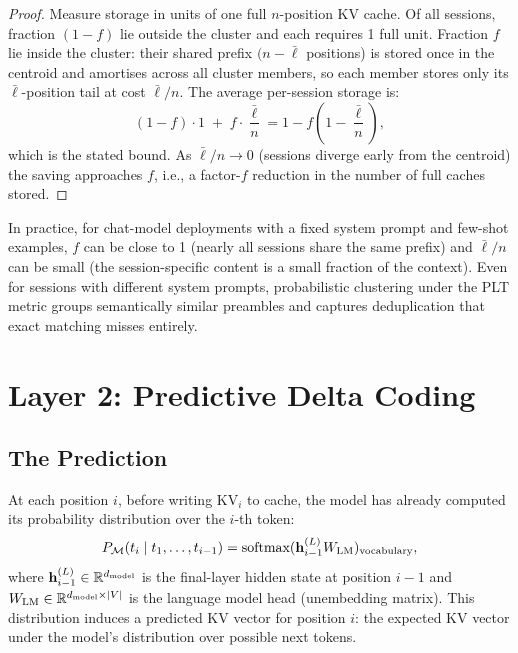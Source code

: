\documentclass[11pt]{article}
\begin{document}
\begin{proof}
Measure storage in units of one full $n$-position KV cache.
Of all sessions, fraction $(1-f)$ lie outside the cluster and each requires
1 full unit.  Fraction $f$ lie inside the cluster: their shared prefix
$(n - \bar{\ell}$ positions) is stored once in the centroid and amortises
across all cluster members, so each member stores only its $\bar{\ell}$-position
tail at cost $\bar{\ell}/n$.  The average per-session storage is:
\[
  (1-f) \cdot 1 \;+\; f \cdot \frac{\bar{\ell}}{n}
  = 1 - f\!\left(1 - \frac{\bar{\ell}}{n}\right),
\]
which is the stated bound.  As $\bar{\ell}/n \to 0$ (sessions diverge early
from the centroid) the saving approaches $f$, i.e., a factor-$f$ reduction
in the number of full caches stored.
\end{proof}

In practice, for chat-model deployments with a fixed system prompt and few-shot
examples, $f$ can be close to 1 (nearly all sessions share the same prefix)
and $\bar{\ell}/n$ can be small (the session-specific content is a small fraction
of the context).  Even for sessions with different system prompts, probabilistic
clustering under the PLT metric groups semantically similar preambles and captures
deduplication that exact matching misses entirely.

\section{Layer 2: Predictive Delta Coding}
\label{sec:delta_coding}

\subsection{The Prediction}

At each position $i$, before writing $\mathrm{KV}_i$ to cache, the model has
already computed its probability distribution over the $i$-th token:
\[
  P_{\mathcal{M}}(t_i \mid t_1, \ldots, t_{i-1}) = \text{softmax}(\mathbf{h}^{(L)}_{i-1} W_{\rm LM})_{\text{vocabulary}},
\]
where $\mathbf{h}^{(L)}_{i-1} \in \mathbb{R}^{d_{\rm model}}$ is the final-layer
hidden state at position $i-1$ and $W_{\rm LM} \in \mathbb{R}^{d_{\rm model} \times |V|}$
is the language model head (unembedding matrix).
This distribution induces a predicted KV vector for position $i$: the expected
KV vector under the model's distribution over possible next tokens.
\end{document}
